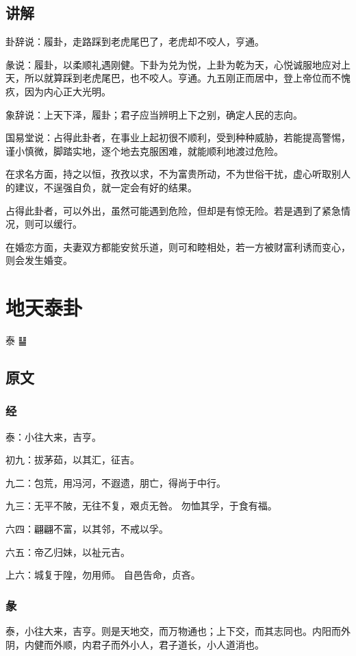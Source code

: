 \documentclass[12pt,oneside]{book}
\begin{document}
\section{讲解}
卦辞说：履卦，走路踩到老虎尾巴了，老虎却不咬人，亨通。

彖说：履卦，以柔顺礼遇刚健。下卦为兑为悦，上卦为乾为天，心悦诚服地应对上天，所以就算踩到老虎尾巴，也不咬人。亨通。九五刚正而居中，登上帝位而不愧疚，因为内心正大光明。

象辞说：上天下泽，履卦；君子应当辨明上下之别，确定人民的志向。

国易堂说：占得此卦者，在事业上起初很不顺利，受到种种威胁，若能提高警惕，谨小慎微，脚踏实地，逐个地去克服困难，就能顺利地渡过危险。

在求名方面，持之以恒，孜孜以求，不为富贵所动，不为世俗干扰，虚心听取别人的建议，不逞强自负，就一定会有好的结果。

占得此卦者，可以外出，虽然可能遇到危险，但却是有惊无险。若是遇到了紧急情况，则可以缓行。

在婚恋方面，夫妻双方都能安贫乐道，则可和睦相处，若一方被财富利诱而变心，则会发生婚变。



\chapter{地天泰卦}
泰 {\Large ䷊}

\section{原文}

\subsection{经}
泰：小往大来，吉亨。

初九：拔茅茹，以其汇，征吉。

九二：包荒，用冯河，不遐遗，朋亡，得尚于中行。

九三：无平不陂，无往不复，艰贞无咎。 勿恤其孚，于食有福。

六四：翩翩不富，以其邻，不戒以孚。

六五：帝乙归妹，以祉元吉。

上六：城复于隍，勿用师。 自邑告命，贞吝。

\subsection{彖}
泰，小往大来，吉亨。则是天地交，而万物通也；上下交，而其志同也。内阳而外阴，内健而外顺，内君子而外小人，君子道长，小人道消也。
\end{document}
